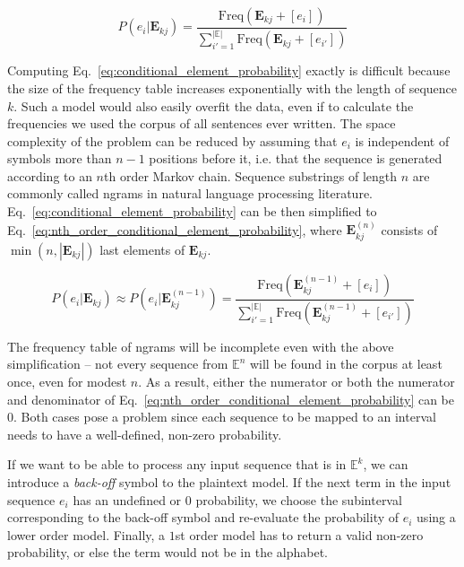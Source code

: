 \documentclass[12pt,twoside,a4paper]{article}
\makeatletter
\newcommand*{\ie}{i.e.\@\xspace}
\makeatother
\begin{document}
\begin{equation}
\label{eq:conditional_element_probability}
P(e_{i} | \mathbf E_{kj}) = \frac {\mathrm{Freq} (\mathbf E_{kj} + [ e_{i} ])} {\sum_{i'=1}^{| \mathbb E |} \mathrm{Freq} ( \mathbf E_{kj} + [e_{i'}] )}
\end{equation}

Computing Eq.~\ref{eq:conditional_element_probability} exactly is difficult because the size of the frequency table increases exponentially with the length of sequence $k$. Such a model would also easily overfit the data, even if to calculate the frequencies we used the corpus of all sentences ever written. The space complexity of the problem can be reduced by assuming that $e_i$ is independent of symbols more than $n-1$ positions before it, \ie that the sequence is generated according to an $n$th order Markov chain. Sequence substrings of length $n$ are commonly called ngrams in natural language processing literature. Eq.~\ref{eq:conditional_element_probability} can be then simplified to Eq.~\ref{eq:nth_order_conditional_element_probability}, where $\mathbf E^{(n)}_{kj}$ consists of $\min(n, |\mathbf E_{kj}|)$ last elements of $\mathbf E_{kj}$.

\begin{equation}
\label{eq:nth_order_conditional_element_probability}
P(e_{i} | \mathbf E_{kj}) \approx P(e_{i} | \mathbf E^{(n-1)}_{kj}) = \frac {\mathrm{Freq} (\mathbf E^{(n-1)}_{kj} + [ e_{i} ])} {\sum_{i'=1}^{| \mathbb E |} \mathrm{Freq} ( \mathbf E^{(n-1)}_{kj} + [e_{i'}] )}
\end{equation}

The frequency table of ngrams will be incomplete even with the above simplification -- not every sequence from $\mathbb E^n$ will be found in the corpus at least once, even for modest $n$.  As a result, either the numerator or both the numerator and denominator of Eq.~\ref{eq:nth_order_conditional_element_probability} can be 0. Both cases pose a problem since each sequence to be mapped to an interval needs to have a well-defined, non-zero probability.

If we want to be able to process any input sequence that is in $\mathbb E^k$, we can introduce a \emph{back-off} symbol to the plaintext model. If the next term in the input sequence $e_i$ has an undefined or 0 probability, we choose the subinterval corresponding to the back-off symbol and re-evaluate the probability of $e_i$ using a lower order model. Finally, a $1$st order model has to return a valid non-zero probability, or else the term would not be in the alphabet.
\end{document}

